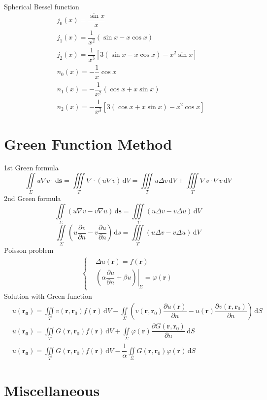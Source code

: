 \documentclass[10pt, a4paper, twocolumn]{article}
\def\D{\partial}
\def\d{\,\mathrm{d}}
\def\phi{\varphi}
\begin{document}
	Spherical Bessel function
	\begin{align*}
		&j_0(x) = \dfrac{\sin x}{x}\\
		&j_1(x) = \dfrac{1}{x^2}(\sin x - x\cos x)\\
		&j_2(x) = \dfrac{1}{x^3}[3(\sin x - x\cos x)-x^2\sin x]\\
		&n_0(x) = -\dfrac{1}{x}\cos x\\
		&n_1(x) = -\dfrac{1}{x^2}(\cos x + x\sin x)\\
		&n_2(x) = -\dfrac{1}{x^3}[3(\cos x + x\sin x) - x^2\cos x]
	\end{align*}
\section{Green Function Method}
	1st Green formula $$\iint\limits_\Sigma u\nabla v\cdot \d\bm{s}
		= \iiint \limits_T \nabla \cdot (u \nabla v) \d V
		= \iiint \limits_T u \Delta v \d V
		+ \iiint \limits_T \nabla v \cdot \nabla v \d V$$
	2nd Green formula $$\iint \limits_\Sigma (u \nabla v - v \nabla u) \d\bm{s}
		= \iiint \limits_T (u \Delta v - v \Delta u) \d V$$
	$$\iint \limits_\Sigma \left(u\dfrac{\D v}{\D n} - v\dfrac{\D u}{\D n}\right)\d s
	= \iiint \limits_T (u \Delta v - v \Delta u) \d V$$
	Poisson problem
	\begin{align*}
		\left\{\begin{aligned}
		&\Delta u(\bm{r}) = f(\bm{r})\\
		&\left.\left(\alpha \dfrac{\D u}{\D n} + \beta u \right)\right|_\Sigma = \phi(\bm{r})
		\end{aligned}\right.
	\end{align*}
	Solution with Green function
	\begin{align*}
		&u(\bm{r_0}) = \iiint \limits_T v(\bm{r}, \bm{r}_0)f(\bm{r})\d V
			- \iint \limits_\Sigma\left(v(\bm{r}, \bm{r}_0) \dfrac{\D u(\bm{r})}{\D n}
			- u(\bm{r}) \dfrac{\D v(\bm{r}, \bm{r}_0)}{\D n}\right)\d S\\
		&u(\bm{r_0}) = \iiint \limits_T G(\bm{r}, \bm{r}_0)f(\bm{r})\d V
			+ \iint \limits_\Sigma \phi(\bm{r}) \dfrac{\D G(\bm{r}, \bm{r}_0)}{\D n}\d S\\
		&u(\bm{r_0}) = \iiint \limits_T G(\bm{r}, \bm{r}_0)f(\bm{r})\d V
			- \dfrac{1}{\alpha} \iint \limits_\Sigma G(\bm{r}, \bm{r}_0) \phi(\bm{r})\d S	
	\end{align*}
\section{Miscellaneous}
\end{document}
